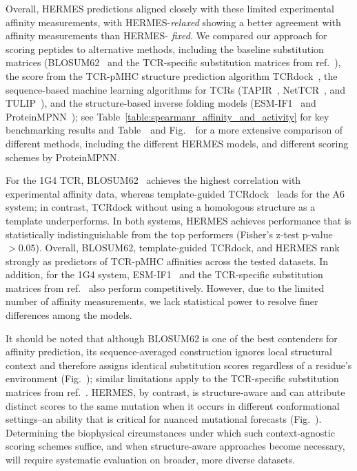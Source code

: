 {Overall, HERMES predictions aligned closely with these limited experimental affinity measurements,
with HERMES-{\em relaxed} showing a better agreement with affinity measurements than HERMES-{\em
fixed}.
We compared our approach for scoring peptides to alternative methods, including the baseline
substitution matrices (BLOSUM62~\cite{Henikoff1992-jq} and the TCR-specific substitution matrices
from ref.~\cite{Luksza2022-gx}), the score from the TCR-pMHC structure prediction algorithm
TCRdock~\cite{Bradley2023-rl}, the sequence-based machine learning algorithms for TCRs
(TAPIR~\cite{Fast2023-tk}, NetTCR~\cite{Jensen2024-xs}, and TULIP~\cite{Meynard-Piganeau2024-po}),
and the structure-based inverse folding models (ESM-IF1~\cite{Hsu2022-km} and
ProteinMPNN~\cite{Dauparas2022-fu}); see Table~\ref{table:spearmanr_affinity_and_activity} for key
benchmarking results and Table~\SpearmanrAffinityTable~and Fig.~\ProteinMPNNScoringSchemesFigure~for
a more extensive comparison of different methods, including the different HERMES models, and
different scoring schemes by ProteinMPNN.
 
For the 1G4 TCR, BLOSUM62~\cite{Henikoff1992-jq} achieves the highest correlation with experimental
affinity data, whereas template-guided TCRdock~\cite{Bradley2023-rl} leads for the A6 system; in
contrast, TCRdock without using a homologous structure as a template underperforms. In both systems,
HERMES achieves performance that is statistically indistinguishable from the top performers
(Fisher's z-test p-value $>0.05$). Overall, BLOSUM62, template-guided TCRdock, and HERMES rank
strongly as predictors of TCR-pMHC affinities across the tested datasets. In addition, for the 1G4
system, ESM-IF1~\cite{Hsu2022-km} and the TCR-specific substitution matrices from
ref.~\cite{Luksza2022-gx} also perform competitively. However, due to the limited number of affinity
measurements, we lack statistical power to resolve finer differences among the models.

It should be noted that although BLOSUM62 is one of the best contenders for affinity prediction, its
sequence‑averaged construction ignores local structural context and therefore assigns identical
substitution scores regardless of a residue's environment (Fig.~\HsiueHisFigure); similar
limitations apply to the TCR-specific substitution matrices from ref.~\cite{Luksza2022-gx}. HERMES,
by contrast, is structure‑aware and can attribute distinct scores to the same mutation when it
occurs in different conformational settings--an ability that is critical for nuanced mutational
forecasts (Fig.~\HsiueHisFigure). Determining the biophysical circumstances under which such
context‑agnostic scoring schemes suffice, and when structure‑aware approaches become necessary, will
require systematic evaluation on broader, more diverse datasets.


}
